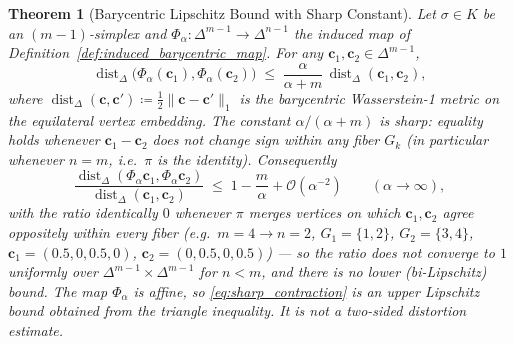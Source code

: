 \documentclass[11pt,a4paper]{article}
\theoremstyle{plain}
\newtheorem{theorem}{Theorem}[section]
\theoremstyle{definition}
\theoremstyle{remark}
\numberwithin{equation}{section}
\begin{document}
\begin{theorem}[Barycentric Lipschitz Bound with Sharp Constant]
\label{thm:barycentric_ratio}
Let $\sigma \in K$ be an $(m-1)$-simplex and $\Phi_\alpha : \Delta^{m-1} \to \Delta^{n-1}$ the induced map of Definition~\ref{def:induced_barycentric_map}. For any $\mathbf{c}_1, \mathbf{c}_2 \in \Delta^{m-1}$,
\begin{equation}
\label{eq:sharp_contraction}
\operatorname{dist}_\Delta\big(\Phi_\alpha(\mathbf{c}_1), \Phi_\alpha(\mathbf{c}_2)\big) \;\le\; \frac{\alpha}{\alpha+m}\,\operatorname{dist}_\Delta(\mathbf{c}_1, \mathbf{c}_2),
\end{equation}
where $\operatorname{dist}_\Delta(\mathbf{c},\mathbf{c}') \coloneqq \tfrac{1}{2}\|\mathbf{c}-\mathbf{c}'\|_1$ is the barycentric Wasserstein-1 metric on the equilateral vertex embedding. The constant $\alpha/(\alpha+m)$ is sharp: equality holds whenever $\mathbf{c}_1 - \mathbf{c}_2$ does not change sign within any fiber $G_k$ (in particular whenever $n = m$, i.e.\ $\pi$ is the identity). Consequently
\begin{equation}
\frac{\operatorname{dist}_\Delta(\Phi_\alpha \mathbf{c}_1, \Phi_\alpha \mathbf{c}_2)}{\operatorname{dist}_\Delta(\mathbf{c}_1, \mathbf{c}_2)} \;\le\; 1 - \frac{m}{\alpha} + \mathcal{O}(\alpha^{-2}) \qquad (\alpha \to \infty),
\end{equation}
with the ratio identically $0$ whenever $\pi$ merges vertices on which $\mathbf{c}_1,\mathbf{c}_2$ agree oppositely within every fiber (e.g.\ $m=4 \to n=2$, $G_1=\{1,2\}$, $G_2=\{3,4\}$, $\mathbf{c}_1=(0.5,0,0.5,0)$, $\mathbf{c}_2=(0,0.5,0,0.5)$) --- so the ratio does \emph{not} converge to $1$ uniformly over $\Delta^{m-1}\times\Delta^{m-1}$ for $n<m$, and there is no lower (bi-Lipschitz) bound. The map $\Phi_\alpha$ is affine, so \eqref{eq:sharp_contraction} is an upper Lipschitz bound obtained from the triangle inequality. It is not a two-sided distortion estimate.
\end{theorem}
\end{document}
